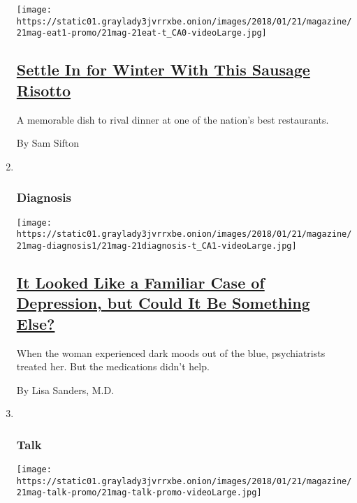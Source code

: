 \begin{enumerate}
  \texttt{[image: https://static01.graylady3jvrrxbe.onion/images/2018/01/21/magazine/21mag-eat1-promo/21mag-21eat-t\_CA0-videoLarge.jpg]}

  \hypertarget{settle-in-for-winter-with-this-sausage-risotto}{%
  \subsection{\texorpdfstring{\href{/2018/01/18/magazine/winter-cheesey-risotto-sausage.html}{Settle
  In for Winter With This Sausage
  Risotto}}{Settle In for Winter With This Sausage Risotto}}\label{settle-in-for-winter-with-this-sausage-risotto}}

  A memorable dish to rival dinner at one of the nation's best
  restaurants.

  By Sam Sifton
\item ~
  \hypertarget{diagnosis}{%
  \subsubsection{Diagnosis}\label{diagnosis}}

  \texttt{[image: https://static01.graylady3jvrrxbe.onion/images/2018/01/21/magazine/21mag-diagnosis1/21mag-21diagnosis-t\_CA1-videoLarge.jpg]}

  \hypertarget{it-looked-like-a-familiar-case-of-depression-but-could-it-be-something-else}{%
  \subsection{\texorpdfstring{\href{/2018/01/18/magazine/it-looked-like-a-familiar-case-of-depression-but-could-it-be-something-else.html}{It
  Looked Like a Familiar Case of Depression, but Could It Be Something
  Else?}}{It Looked Like a Familiar Case of Depression, but Could It Be Something Else?}}\label{it-looked-like-a-familiar-case-of-depression-but-could-it-be-something-else}}

  When the woman experienced dark moods out of the blue, psychiatrists
  treated her. But the medications didn't help.

  By Lisa Sanders, M.D.
\item ~
  \hypertarget{talk}{%
  \subsubsection{Talk}\label{talk}}

  \texttt{[image: https://static01.graylady3jvrrxbe.onion/images/2018/01/21/magazine/21mag-talk-promo/21mag-talk-promo-videoLarge.jpg]}


\end{enumerate}
